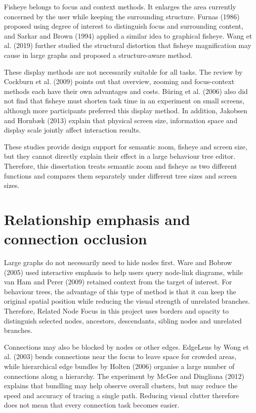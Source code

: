 Fisheye belongs to focus and context methods. It enlarges the area currently concerned by the user while keeping the surrounding structure. Furnas (1986) proposed using degree of interest to distinguish focus and surrounding content, and Sarkar and Brown (1994) applied a similar idea to graphical fisheye. Wang et al. (2019) further studied the structural distortion that fisheye magnification may cause in large graphs and proposed a structure-aware method.

These display methods are not necessarily suitable for all tasks. The review by Cockburn et al. (2009) points out that overview, zooming and focus-context methods each have their own advantages and costs. Büring et al. (2006) also did not find that fisheye must shorten task time in an experiment on small screens, although more participants preferred this display method. In addition, Jakobsen and Hornbæk (2013) explain that physical screen size, information space and display scale jointly affect interaction results.

These studies provide design support for semantic zoom, fisheye and screen size, but they cannot directly explain their effect in a large behaviour tree editor. Therefore, this dissertation treats semantic zoom and fisheye as two different functions and compares them separately under different tree sizes and screen sizes.

\section{Relationship emphasis and connection occlusion}

Large graphs do not necessarily need to hide nodes first. Ware and Bobrow (2005) used interactive emphasis to help users query node-link diagrams, while van Ham and Perer (2009) retained context from the target of interest. For behaviour trees, the advantage of this type of method is that it can keep the original spatial position while reducing the visual strength of unrelated branches. Therefore, Related Node Focus in this project uses borders and opacity to distinguish selected nodes, ancestors, descendants, sibling nodes and unrelated branches.

Connections may also be blocked by nodes or other edges. EdgeLens by Wong et al. (2003) bends connections near the focus to leave space for crowded areas, while hierarchical edge bundles by Holten (2006) organise a large number of connections along a hierarchy. The experiment by McGee and Dingliana (2012) explains that bundling may help observe overall clusters, but may reduce the speed and accuracy of tracing a single path. Reducing visual clutter therefore does not mean that every connection task becomes easier.

